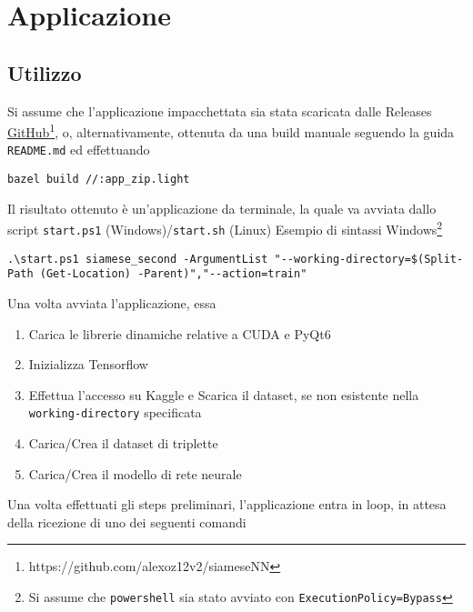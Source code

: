 \documentclass[twocolumn]{article}
\begin{document}
\section{Applicazione}
\subsection{Utilizzo}
Si assume che l'applicazione impacchettata sia stata scaricata dalle Releases \href{https://github.com/alexoz12v2/siameseNN}{GitHub}\footnote{https://github.com/alexoz12v2/siameseNN}, o, alternativamente, 
ottenuta da una build manuale seguendo la guida \texttt{README.md} ed effettuando
\begin{lstlisting}[style=shellstyle]
    bazel build //:app_zip.light
\end{lstlisting}
Il risultato ottenuto \`e un'applicazione da terminale, la quale va avviata dallo script \texttt{start.ps1} (Windows)/\texttt{start.sh} (Linux)
Esempio di sintassi Windows\footnote{Si assume che \texttt{powershell} sia stato avviato con \texttt{ExecutionPolicy=Bypass}}
\begin{lstlisting}[style=shellstyle]
    .\start.ps1 siamese_second -ArgumentList "--working-directory=$(Split-Path (Get-Location) -Parent)","--action=train"
\end{lstlisting}
Una volta avviata l'applicazione, essa
\begin{enumerate}[topsep=0pt, noitemsep]
    \item Carica le librerie dinamiche relative a CUDA e PyQt6
    \item Inizializza Tensorflow
    \item Effettua l'accesso su Kaggle e Scarica il dataset, se non esistente nella \texttt{working-directory} specificata
    \item Carica/Crea il dataset di triplette
    \item Carica/Crea il modello di rete neurale
\end{enumerate}
Una volta effettuati gli steps preliminari, l'applicazione entra in loop, in attesa della ricezione di uno dei seguenti comandi
\end{document}
